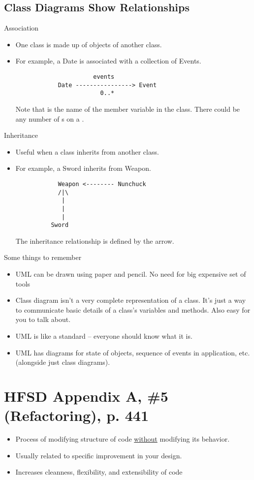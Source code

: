 \documentclass[letterpaper]{article}
\begin{document}
\subsection{Class Diagrams Show Relationships}
Association
\begin{itemize}
    \item One class is made up of objects of another class. 
    \item For example, a Date is associated with a collection of Events. 
    \begin{mdframed}
        \begin{verbatim}
                      events 
            Date ----------------> Event
                        0..*\end{verbatim}
    \end{mdframed}
    Note that  is the name of the member variable in the  class. There could be any number of s on a .
\end{itemize}
Inheritance 
\begin{itemize}
    \item Useful when a class inherits from another class. 
    \item For example, a Sword inherits from Weapon.
    \begin{mdframed}
        \begin{verbatim}
            Weapon <-------- Nunchuck
            /|\
             |
             |
             |
          Sword\end{verbatim} 
    \end{mdframed}
    The inheritance relationship is defined by the arrow.
\end{itemize}
Some things to remember 
\begin{itemize}
    \item UML can be drawn using paper and pencil. No need for big expensive set of tools 
    \item Class diagram isn't a very complete representation of a class. It's just a way to communicate basic details of a class's variables and methods. Also easy for you to talk about. 
    \item UML is like a standard -- everyone should know what it is. 
    \item UML has diagrams for state of objects, sequence of events in application, etc. (alongside just class diagrams).
\end{itemize}

\section{HFSD Appendix A, \#5 (Refactoring), p. 441}
\begin{itemize}
    \item Process of modifying structure of code \underline{without} modifying its behavior. 
    \item Usually related to specific improvement in your design. 
    \item Increases cleanness, flexibility, and extensibility of code 
\end{itemize}
\end{document}
